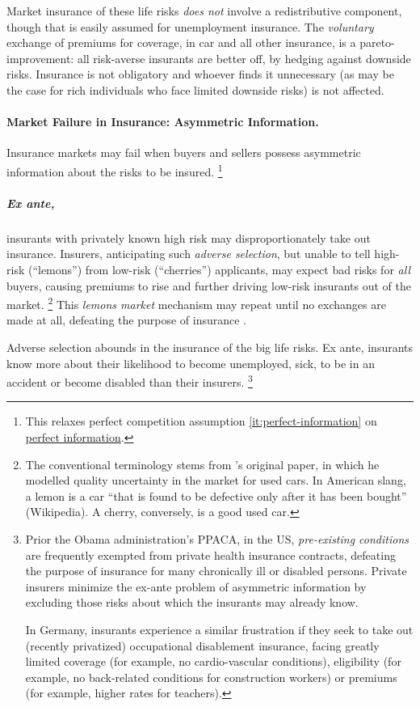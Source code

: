 Market insurance of these life risks \emph{does not} involve a redistributive component, though that is easily assumed for unemployment insurance.
The \emph{voluntary} exchange of premiums for coverage, in car and all other insurance, is a pareto-improvement:
all risk-averse insurants are better off, by hedging against downside risks.
Insurance is not obligatory and whoever finds it unnecessary (as may be the case for rich individuals who face limited downside risks) is not affected.


\paragraph{Market Failure in Insurance: Asymmetric Information.}
\label{sec:asymmetric-information}

Insurance markets may fail when buyers and sellers possess asymmetric information about the risks to be insured.
\footnote{
	This relaxes perfect competition assumption \ref{it:perfect-information} on \hyperref[it:perfect-information]{perfect information}.
}


\subparagraph[Adverse Selection]{Ex ante,} \label{sec:adverse-selection} insurants with privately known high risk may disproportionately take out insurance.
Insurers, anticipating such \emph{adverse selection}, but unable to tell high-risk (``lemons'') from low-risk (``cherries'') applicants,  may expect bad risks for \emph{all} buyers, causing premiums to rise and further driving low-risk insurants out of the market.
\footnote{
	The conventional terminology stems from \citeauthor{Akerlof-1970-aa}'s original paper, in which he modelled  quality uncertainty in the market for used cars.
	In American slang, a lemon is a car ``that is found to be defective only after it has been bought'' (Wikipedia).
	A cherry, conversely, is a good used car.
}
This \emph{lemons market} mechanism may repeat until no exchanges are made at all, defeating the purpose of insurance \citep{Akerlof-1970-aa}.

Adverse selection abounds in the insurance of the big life risks.
Ex ante, insurants know more about their likelihood to become unemployed, sick, to be in an accident or become disabled than their insurers.
\footnote{
	Prior the Obama administration's \gls{PPACA}, in the US, \emph{pre-existing conditions} are frequently exempted from private health insurance contracts, defeating the purpose of insurance for many chronically ill or disabled persons.
	Private insurers minimize the ex-ante problem of asymmetric information by excluding those risks about which the insurants may already know.

	In Germany, insurants experience a similar frustration if they seek to take out (recently privatized) occupational disablement insurance, facing greatly limited coverage (for example, no cardio-vascular conditions), eligibility (for example, no back-related conditions for construction workers) or premiums (for example, higher rates for teachers).
}

